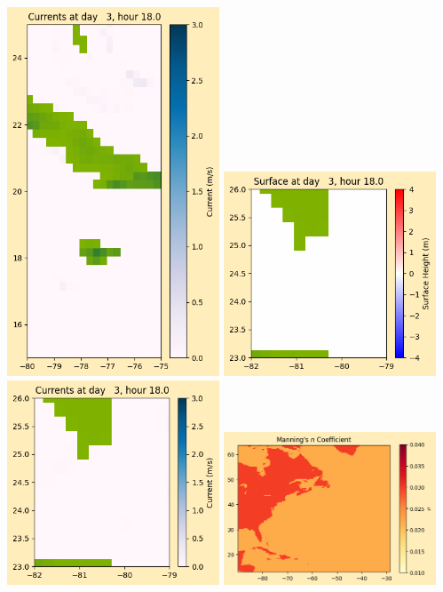\documentclass[11pt]{article}
\begin{document}
\includegraphics[width=0.475\textwidth]{frame0027fig1008.png}
\vskip 10pt 
\includegraphics[width=0.475\textwidth]{frame0027fig1009.png}
\includegraphics[width=0.475\textwidth]{frame0027fig1010.png}
\vskip 10pt 
\includegraphics[width=0.475\textwidth]{frame0027fig1011.png}
\end{document}
